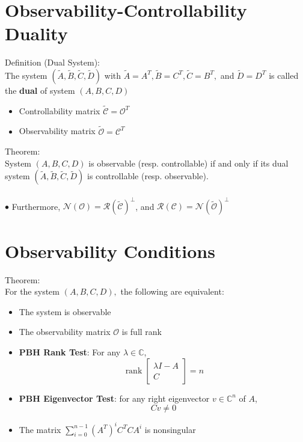 \documentclass[10pt,a4paper,oneside]{article}
\begin{document}
\section{Observability-Controllability Duality}
Definition (Dual System):\\
The system $(\tilde{A}, \tilde{B}, \tilde{C}, \tilde{D})$ with $\tilde{A}=A^{T}, \tilde{B}=C^{T}, \tilde{C}=B^{T},$ and $\tilde{D}=D^{T}$ is called the {\bfseries dual} of system $(A,B,C,D)$
\begin{itemize}
\item Controllability matrix $\tilde{\mathcal{C}}=\mathcal{O}^{T}$
\item Observability matrix $\tilde{\mathcal{O}}=\mathcal{C}^{T}$
\end{itemize}
Theorem:\\
System $(A,B,C,D)$ is observable (resp. controllable) if and only if its dual system $(\tilde{A}, \tilde{B}, \tilde{C}, \tilde{D})$ is controllable (resp. observable).\\
\\$\bullet$ Furthermore, $\mathcal{N}(\mathcal{O})=\mathcal{R}(\tilde{\mathcal{C}})^{\perp}$, and $\mathcal{R}(\mathcal{C})=\mathcal{N}(\tilde{\mathcal{O}})^{\perp}$
\section{Observability Conditions}
Theorem:\\
For the system $(A, B, C, D),$ the following are equivalent:
\begin{itemize}
\item The system is observable
\item The observability matrix $\mathcal{O}$ is full rank
\item {\bfseries PBH Rank Test}: For any $\lambda\in\mathbb{C}$,
\[
\operatorname{rank}\left[\begin{array}{c}{\lambda I-A} \\ {C}\end{array}\right]=n
\]
\item {\bfseries PBH Eigenvector Test}: for any right eigenvector $v\in\mathbb{C}^n$ of $A$,
\[
Cv \neq0
\]
\item The matrix $\sum_{i=0}^{n-1}\left(A^{T}\right)^{i} C^{T} C A^{i}$ is nonsingular
\end{itemize}
\end{document}
